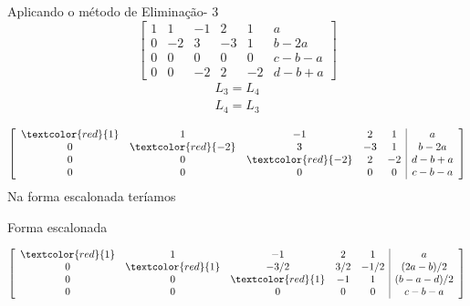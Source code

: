 \documentclass{beamer}
\begin{document}
\begin{frame}{Aplicando o método de Eliminação- 3 }
  $$
  \left[ \begin{array}{ccccc|c}
     1 & 1 & -1 & 2 & 1 & a \\ 
      0 & -2 & 3 &-3 & 1 & b-2a \\
     0 & 0 & 0 & 0 & 0 & c-b-a \\
     0 & 0 & -2 & 2 & -2 & d -b + a
     \end{array}\right]
 $$
 \begin{gather*}  
  L_3 = L_4 \\
  L_4 =L_3
\end{gather*}
\end{frame}

\begin{frame}

  $$
  \left[ \begin{array}{ccccc|c}
     \textcolor{red}{1} & 1 & -1 & 2 & 1 & a \\ 
      0 & \textcolor{red}{-2} & 3 &-3 & 1 & b-2a \\
      0 & 0 & \textcolor{red}{-2} & 2 & -2 & d -b + a \\
      0 & 0 & 0 & 0 & 0 & c-b-a \\
     \end{array}\right]
 $$
Na forma escalonada teríamos
\end{frame}

\begin{frame}{Forma escalonada}

 $$
  \left[ \begin{array}{ccccc|c}
     \textcolor{red}{1} & 1 & -1 & 2 & 1 & a \\ 
      0 & \textcolor{red}{1} & -3/2 &3/2 & -1/2 & (2a-b)/2 \\
      0 & 0 & \textcolor{red}{1} & -1 & 1 & (b - a -d)/2 \\
      0 & 0 & 0 & 0 & 0 & c-b-a \\
     \end{array}\right]
 $$

\end{frame}
\end{document}
